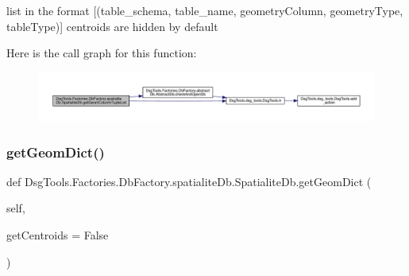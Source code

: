 \begin{DoxyVerb}list in the format [(table_schema, table_name, geometryColumn, geometryType, tableType)]
centroids are hidden by default
\end{DoxyVerb}
 Here is the call graph for this function\+:
\nopagebreak
\begin{figure}[H]
\begin{center}
\leavevmode
\includegraphics[width=350pt]{class_dsg_tools_1_1_factories_1_1_db_factory_1_1spatialite_db_1_1_spatialite_db_a411711f692f22e812ba5323c5e5713f7_cgraph}
\end{center}
\end{figure}
\mbox{\label{class_dsg_tools_1_1_factories_1_1_db_factory_1_1spatialite_db_1_1_spatialite_db_a9ddc3739df2fa11c516d93183d9aa869}} 
\subsubsection{\texorpdfstring{get\+Geom\+Dict()}{getGeomDict()}}
{\footnotesize\ttfamily def Dsg\+Tools.\+Factories.\+Db\+Factory.\+spatialite\+Db.\+Spatialite\+Db.\+get\+Geom\+Dict (\begin{DoxyParamCaption}\item[{}]{self,  }\item[{}]{get\+Centroids = {\ttfamily False} }\end{DoxyParamCaption})}


